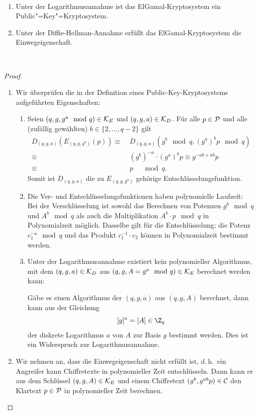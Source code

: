 \begin{theorem}{\ }
 \begin{enumerate}
 \item Unter der Logarithmusannahme ist das ElGamal-Kryptosystem ein Public"=Key"=Kryptosystem. 
 \item Unter der Diffie-Hellman-Annahme erfüllt das ElGamal-Kryptosystem die Einwegeigenschaft.
 \end{enumerate}
 {\ }
\end{theorem}
\begin{proof}{\ }
 \begin{enumerate}
\item Wir überprüfen die in der Definition eines Public-Key-Kryptosystems aufgeführten Eigenschaften:
 \begin{enumerate}
  \item Seien $(q, g, g^a \mod q) \in \mathcal K_E$ und $(q, g, a) \in \mathcal K_D$. Für alle $p \in \mathcal P$ und alle (zufällig gewählten) $b \in \{2, \dots, q-2\}$ gilt
  \begin{align*}
  D_{(q, g, a)}(E_{(q, g, g^a)}(p)) \equiv & \; D_{(q, g, a)}(g^b \mod q, (g^a)^bp \mod q) \\
  \equiv & \; (g^b)^{-a} \cdot (g^a)^bp \equiv g^{-ab + ab}p  \\
  \equiv &\; p \quad \mod q.   
  \end{align*}
  Somit ist $D_{(q, g, a)}$ die zu $E_{(q, g, g^a)}$ gehörige Entschlüsselungsfunktion.
  \item Die Ver- und Entschlüsselungsfunktionen haben polynomielle Laufzeit: Bei der Verschlüsselung ist sowohl das Berechnen von Potenzen $g^b \mod q$ und $A^b \mod q$ als auch die Multiplikation $A^b \cdot p \mod q$ in Polynomialzeit möglich. Dasselbe gilt für die Entschlüsselung; die Potenz $c_1^{-a} \mod q$ und das Produkt $c_1^{-1} \cdot c_2$ können in Polynomialzeit bestimmt werden.
  \item Unter der Logarithmusannahme existiert kein polynomieller Algorithmus, mit dem $(q, g, a) \in \mathcal K_D$ aus $(q, g, A = g^a \mod q) \in \mathcal K_E$ berechnet werden kann:
  
  Gäbe es einen Algorithmus der $(q, g, a)$ aus $(q, g, A)$ berechnet, dann kann aus der Gleichung 
  \[[g]^a = [A] \in \Z_q\]
  der diskrete Logarithmus $a$ von $A$ zur Basis $g$ bestimmt werden. Dies ist ein Widerspruch zur Logarithmusannahme.
 \end{enumerate}
 \item Wir nehmen an, dass die Einwegeigenschaft nicht erfüllt ist, d.\,h.~ein Angreifer kann Chiffretexte in polynomieller Zeit entschlüsseln. Dann kann er aus dem Schlüssel $(q, g, A) \in \mathcal K_E$ und einem Chiffretext $(g^b, g^{ab}p) \in \mathcal C$ den Klartext $p \in \mathcal P$ in polynomieller Zeit berechnen. 
 

\end{enumerate}
\end{proof}

